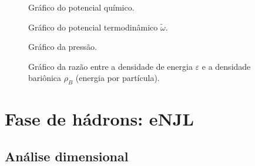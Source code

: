 \begin{figure}
	
	\caption{Gráfico do potencial químico. \protect}
	\label{Fig:chemical_potential_NJL-D_1}
\end{figure}

\begin{figure}
	
	\caption{Gráfico do potencial termodinâmico $\tilde{\omega}$. \protect}
	\label{Fig:thermodynamic_potential_NJL-D_1}
\end{figure}

\begin{figure}
	
	\caption{Gráfico da pressão. \protect}
	\label{Fig:pressure_NJL-D_1}
\end{figure}

\begin{figure}
	
	\caption{Gráfico da razão entre a densidade de energia $\varepsilon$ e a densidade bariônica $\rho_B$ (energia por partícula). \protect}
	\label{Fig:energy_density_per_particle_NJL-D_1}
\end{figure}

\FloatBarrier


\section{Fase de hádrons: eNJL}

\subsection{Análise dimensional}

